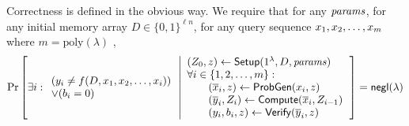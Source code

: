 Correctness is defined in the obvious way. We require that for any
$\mathit{params}$,
for any initial memory array $D \in \{0, 1\}^{\ell n}$,
for any query sequence $x_1, x_2, \ldots, x_m$ where
$m = \text{poly}(\lambda)$ ,
\[
\Pr\left[
\exists i:
\begin{array}{l}
(y_i \neq f(D, x_1, x_2, \ldots, x_i))\\
\vee (b_i = 0)
\end{array}
\left|
\begin{array}{l}
(Z_0, z)\leftarrow \mathsf{Setup}(1^\lambda, D, \mathit{params})\\
\forall i \in \{1, 2, \ldots, m\}:\\
\quad \quad (\overline{x}_i, z) \leftarrow \mathsf{ProbGen}(x_i, z)\\
\quad \quad (\overline{y}_i, Z_i) \leftarrow
\mathsf{Compute}(\overline{x}_i, Z_{i-1})\\
\quad \quad (y_i, b_i, z) \leftarrow \mathsf{Verify}(\overline{y}_i, z)
\end{array}
\right.
\right]
= \mathsf{negl}(\lambda)
\]


